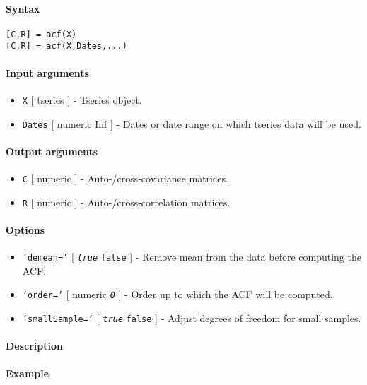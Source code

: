 


	\paragraph{Syntax}\label{syntax}

\begin{verbatim}
[C,R] = acf(X)
[C,R] = acf(X,Dates,...)
\end{verbatim}

\paragraph{Input arguments}\label{input-arguments}

\begin{itemize}
\item
  \texttt{X} {[} tseries {]} - Tseries object.
\item
  \texttt{Dates} {[} numeric \textbar{} Inf {]} - Dates or date range on
  which tseries data will be used.
\end{itemize}

\paragraph{Output arguments}\label{output-arguments}

\begin{itemize}
\item
  \texttt{C} {[} numeric {]} - Auto-/cross-covariance matrices.
\item
  \texttt{R} {[} numeric {]} - Auto-/cross-correlation matrices.
\end{itemize}

\paragraph{Options}\label{options}

\begin{itemize}
\item
  \texttt{'demean='} {[} \emph{\texttt{true}} \textbar{} \texttt{false}
  {]} - Remove mean from the data before computing the ACF.
\item
  \texttt{'order='} {[} numeric \textbar{} \emph{\texttt{0}} {]} - Order
  up to which the ACF will be computed.
\item
  \texttt{'smallSample='} {[} \emph{\texttt{true}} \textbar{}
  \texttt{false} {]} - Adjust degrees of freedom for small samples.
\end{itemize}

\paragraph{Description}\label{description}

\paragraph{Example}\label{example}


